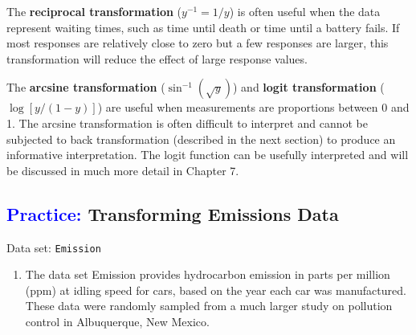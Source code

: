 \documentclass[
]{report}
\providecommand{\tightlist}{%
  \setlength{\itemsep}{0pt}\setlength{\parskip}{0pt}}
\begin{document}
The \textbf{reciprocal transformation} (\(\scriptstyle y^{-1} = 1/y\)) is often useful when the data represent waiting times, such as time until death or time until a battery fails. If most responses are relatively close to zero but a few responses are larger, this transformation will reduce the effect of large response values.

The \textbf{arcsine transformation} (\(\scriptstyle \sin^{-1}(\sqrt{y})\)) and \textbf{logit transformation} (\(\scriptstyle \log[y/(1-y)]\)) are useful when measurements are proportions between 0 and 1. The arcsine transformation is often difficult to interpret and cannot be subjected to back transformation (described in the next section) to produce an informative interpretation. The logit function can be usefully interpreted and will be discussed in much more detail in Chapter 7.

\hypertarget{transforming-emissions-data}{%
\subsection*{\texorpdfstring{\textcolor{blue}{Practice:} Transforming Emissions Data}{ Transforming Emissions Data}}\label{transforming-emissions-data}}

Data set: \texttt{Emission}

\begin{enumerate}
\def\labelenumi{\arabic{enumi}.}
\setcounter{enumi}{30}
\tightlist
\item
  The data set Emission provides hydrocarbon emission in parts per million (ppm) at idling speed for cars, based on the year each car was manufactured. These data were randomly sampled from a much larger study on pollution control in Albuquerque, New Mexico.
\end{enumerate}
\end{document}
